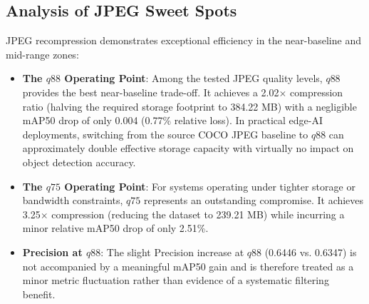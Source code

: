 \documentclass[12pt, a4paper]{article}
\begin{document}
\subsection{Analysis of JPEG Sweet Spots}
JPEG recompression demonstrates exceptional efficiency in the near-baseline and mid-range zones:
\begin{itemize}
    \item \textbf{The $q88$ Operating Point}: Among the tested JPEG quality levels, $q88$ provides the best near-baseline trade-off. It achieves a 2.02$\times$ compression ratio (halving the required storage footprint to 384.22 MB) with a negligible mAP50 drop of only 0.004 (0.77\% relative loss). In practical edge-AI deployments, switching from the source COCO JPEG baseline to $q88$ can approximately double effective storage capacity with virtually no impact on object detection accuracy.
    \item \textbf{The $q75$ Operating Point}: For systems operating under tighter storage or bandwidth constraints, $q75$ represents an outstanding compromise. It achieves 3.25$\times$ compression (reducing the dataset to 239.21 MB) while incurring a minor relative mAP50 drop of only 2.51\%.
    \item \textbf{Precision at $q88$}: The slight Precision increase at $q88$ (0.6446 vs. 0.6347) is not accompanied by a meaningful mAP50 gain and is therefore treated as a minor metric fluctuation rather than evidence of a systematic filtering benefit.
\end{itemize}
\end{document}
